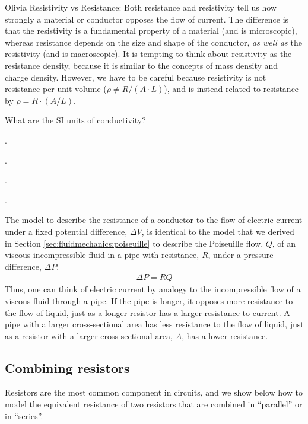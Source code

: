 \begin{studentOpinion}{Olivia}
Resistivity vs Resistance: Both resistance and resistivity tell us how strongly a material or conductor opposes the flow of current. The difference is that the resistivity is a fundamental property of a material (and is microscopic), whereas resistance depends on the size and shape of the conductor, \textit{as well as} the resistivity (and is macroscopic). It is tempting to think about resistivity as the resistance density, because it is similar to the concepts of mass density and charge density. However, we have to be careful because resistivity is not resistance per unit volume ($\rho \neq R/(A\cdot L)$), and is instead related to resistance by $\rho=R\cdot (A/L)$.


\end{studentOpinion}

\begin{checkpoint}
	\begin{MCquestion}{What are the SI units of conductivity?}
		\item \SI{}{}.
		\item \SI{}{}. \correct
		\item \SI{}{}.
		\item \SI{}{}.
	\end{MCquestion}
\end{checkpoint}


The model to describe the resistance of a conductor to the flow of electric current under a fixed potential difference, $\Delta V$, is identical to the model that we derived in Section \ref{sec:fluidmechanics:poiseuille} to describe the Poiseuille flow, $Q$, of an viscous incompressible fluid in a pipe with resistance, $R$, under a pressure difference, $\Delta P$:
\begin{align*}
\Delta P = RQ
\end{align*}
Thus, one can think of electric current by analogy to the incompressible flow of a viscous fluid through a pipe. If the pipe is longer, it opposes more resistance to the flow of liquid, just as a longer resistor has a larger resistance to current. A pipe with a larger cross-sectional area has less resistance to the flow of liquid, just as a resistor with a larger cross sectional area, $A$, has a lower resistance.
\subsection{Combining resistors}
Resistors are the most common component in circuits, and we show below how to model the equivalent resistance of two resistors that are combined in ``parallel'' or in ``series''.

